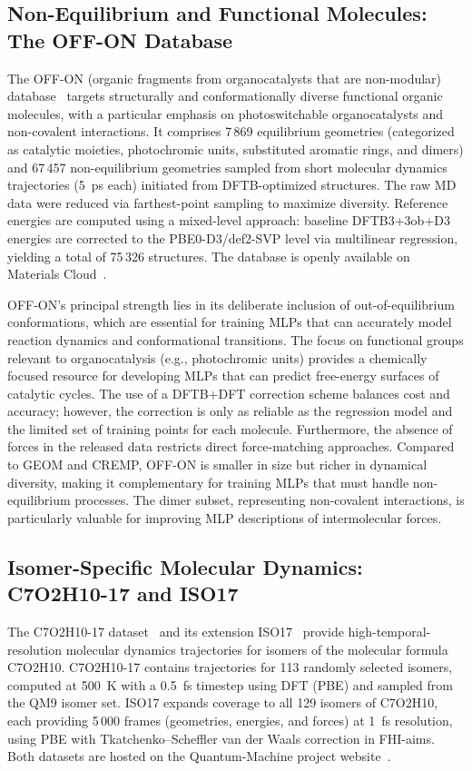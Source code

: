 \documentclass[12pt]{article}
\begin{document}
\subsection{Non-Equilibrium and Functional Molecules: The OFF-ON Database}
\label{sec:offon}

The OFF-ON (organic fragments from organocatalysts that are non-modular) database~\cite{ds36-24} targets structurally and conformationally diverse functional organic molecules, with a particular emphasis on photoswitchable organocatalysts and non-covalent interactions. It comprises 7\,869 equilibrium geometries (categorized as catalytic moieties, photochromic units, substituted aromatic rings, and dimers) and 67\,457 non-equilibrium geometries sampled from short molecular dynamics trajectories (5~ps each) initiated from DFTB-optimized structures. The raw MD data were reduced via farthest-point sampling to maximize diversity. Reference energies are computed using a mixed-level approach: baseline DFTB3+3ob+D3 energies are corrected to the PBE0-D3/def2-SVP level via multilinear regression, yielding a total of 75\,326 structures. The database is openly available on Materials Cloud~\cite{ds36-172}.

OFF-ON's principal strength lies in its deliberate inclusion of out-of-equilibrium conformations, which are essential for training MLPs that can accurately model reaction dynamics and conformational transitions. The focus on functional groups relevant to organocatalysis (e.g., photochromic units) provides a chemically focused resource for developing MLPs that can predict free-energy surfaces of catalytic cycles. The use of a DFTB+DFT correction scheme balances cost and accuracy; however, the correction is only as reliable as the regression model and the limited set of training points for each molecule. Furthermore, the absence of forces in the released data restricts direct force-matching approaches. Compared to GEOM and CREMP, OFF-ON is smaller in size but richer in dynamical diversity, making it complementary for training MLPs that must handle non-equilibrium processes. The dimer subset, representing non-covalent interactions, is particularly valuable for improving MLP descriptions of intermolecular forces.

\subsection{Isomer-Specific Molecular Dynamics: C7O2H10-17 and ISO17}
\label{sec:isomers}

The C7O2H10-17 dataset~\cite{ds37-10} and its extension ISO17~\cite{ds38-17} provide high-temporal-resolution molecular dynamics trajectories for isomers of the molecular formula C7O2H10. C7O2H10-17 contains trajectories for 113 randomly selected isomers, computed at 500~K with a 0.5~fs timestep using DFT (PBE) and sampled from the QM9 isomer set. ISO17 expands coverage to all 129 isomers of C7O2H10, each providing 5\,000 frames (geometries, energies, and forces) at 1~fs resolution, using PBE with Tkatchenko–Scheffler van der Waals correction in FHI-aims. Both datasets are hosted on the Quantum-Machine project website~\cite{ds37-185,ds38-185}.
\end{document}
